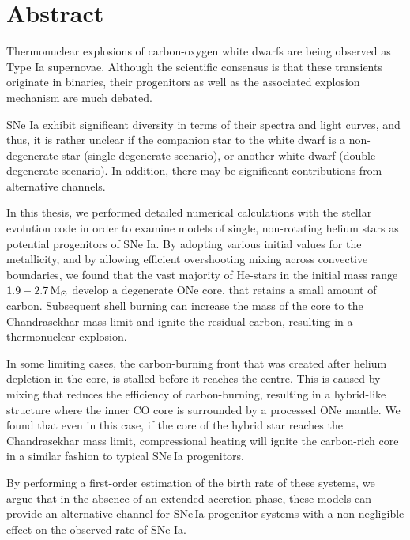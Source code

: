 \documentclass[../main/thesis_msc.tex]{subfiles}
\begin{document}
\chapter*{Abstract}

Thermonuclear explosions of carbon-oxygen white dwarfs are being observed as Type Ia supernovae. 
Although the scientific consensus is that  these transients originate in binaries, their progenitors as well as the associated explosion mechanism are much debated. 

SNe Ia exhibit significant diversity in terms of their spectra and light curves, and thus, it is rather unclear if the companion star to the white dwarf is a non-degenerate star (single degenerate scenario), or another white dwarf (double degenerate scenario). In addition, there may be significant contributions from alternative channels. 

In this thesis, we performed detailed numerical calculations with the \mesa stellar evolution code in order to examine models of single, non-rotating helium stars as potential progenitors of SNe Ia. By adopting various initial values for the metallicity, and by allowing efficient overshooting mixing across convective boundaries, we found that the vast majority of He-stars in the initial mass range $\rm 1.9-2.7\, M_{\odot}$ develop a degenerate ONe core, that retains a small amount of carbon. Subsequent shell burning can increase the mass of the core to the Chandrasekhar mass limit and ignite the residual carbon, resulting in a thermonuclear explosion. 

In some limiting cases, the carbon-burning front that was created after helium depletion in the core, is stalled before it reaches the centre. This is caused by mixing that reduces the efficiency of carbon-burning, resulting in a hybrid-like structure where the inner CO core is surrounded by a processed ONe mantle. We found that even in this case, if the core of the hybrid star reaches the Chandrasekhar mass limit, compressional heating will ignite the carbon-rich core in a similar fashion to typical SNe\,Ia progenitors.

By performing a first-order estimation of the birth rate of these systems, we argue that in the absence of an extended accretion phase, these models can provide an alternative channel for SNe\,Ia progenitor systems with a non-negligible effect on the observed rate of SNe Ia.
\end{document}

